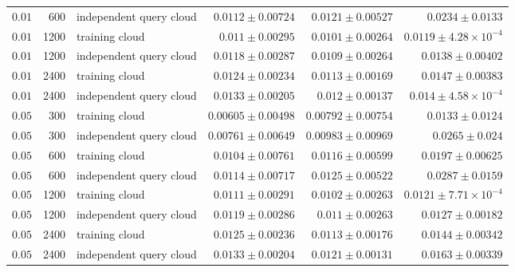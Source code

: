 \documentclass[
  11pt,
  letterpaper,
  onehalfspacing,
  normalmargins,
  equalmargins,
  oneside
]{ut-thesis}
\begin{document}
\begin{longtable}{r r L{0.25\textwidth} r r r}
$0.01$ & 600 & independent query cloud & $0.0112\pm 0.00724$ & $0.0121\pm 0.00527$ & $0.0234\pm 0.0133$ \\
$0.01$ & 1200 & training cloud & $0.011\pm 0.00295$ & $0.0101\pm 0.00264$ & $0.0119\pm 4.28\times10^{-4}$ \\
$0.01$ & 1200 & independent query cloud & $0.0118\pm 0.00287$ & $0.0109\pm 0.00264$ & $0.0138\pm 0.00402$ \\
$0.01$ & 2400 & training cloud & $0.0124\pm 0.00234$ & $0.0113\pm 0.00169$ & $0.0147\pm 0.00383$ \\
$0.01$ & 2400 & independent query cloud & $0.0133\pm 0.00205$ & $0.012\pm 0.00137$ & $0.014\pm 4.58\times10^{-4}$ \\
$0.05$ & 300 & training cloud & $0.00605\pm 0.00498$ & $0.00792\pm 0.00754$ & $0.0133\pm 0.0124$ \\
$0.05$ & 300 & independent query cloud & $0.00761\pm 0.00649$ & $0.00983\pm 0.00969$ & $0.0265\pm 0.024$ \\
$0.05$ & 600 & training cloud & $0.0104\pm 0.00761$ & $0.0116\pm 0.00599$ & $0.0197\pm 0.00625$ \\
$0.05$ & 600 & independent query cloud & $0.0114\pm 0.00717$ & $0.0125\pm 0.00522$ & $0.0287\pm 0.0159$ \\
$0.05$ & 1200 & training cloud & $0.0111\pm 0.00291$ & $0.0102\pm 0.00263$ & $0.0121\pm 7.71\times10^{-4}$ \\
$0.05$ & 1200 & independent query cloud & $0.0119\pm 0.00286$ & $0.011\pm 0.00263$ & $0.0127\pm 0.00182$ \\
$0.05$ & 2400 & training cloud & $0.0125\pm 0.00236$ & $0.0113\pm 0.00176$ & $0.0144\pm 0.00342$ \\
$0.05$ & 2400 & independent query cloud & $0.0133\pm 0.00204$ & $0.0121\pm 0.00131$ & $0.0163\pm 0.00339$ \\
\end{longtable}
\endgroup
\end{document}
